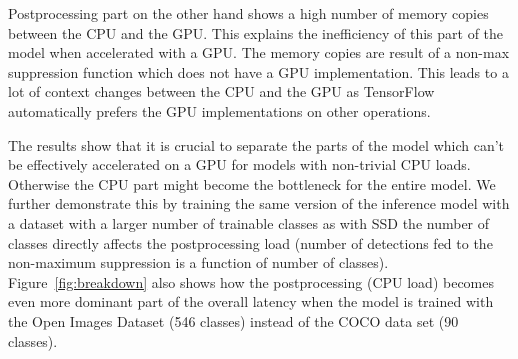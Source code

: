\documentclass[sigconf]{acmart}
\begin{document}
\begin{table}[]
\centering
\caption{Device placement and memory copy counts for SSD Inception V2 with automatic placement using TensorFlow. (H=Host, D=Device}
\label{tab:opcounts}
\end{table}

Postprocessing part on the other hand shows a high number of memory copies between the CPU and the GPU. This explains the inefficiency of this part of the model when accelerated with a GPU. The memory copies are result of a non-max suppression function which does not have a GPU implementation. This leads to a lot of context changes between the CPU and the GPU as TensorFlow automatically prefers the GPU implementations on other operations.

The results show that it is crucial to separate the parts of the model which can't be effectively accelerated on a GPU for models with non-trivial CPU loads. Otherwise the CPU part might become the bottleneck for the entire model. We further demonstrate this by training the same version of the inference model with a dataset with a larger number of trainable classes as with SSD the number of classes directly affects the postprocessing load (number of detections fed to the non-maximum suppression is a function of number of classes). Figure~\ref{fig:breakdown} also shows how the postprocessing (CPU load) becomes even more dominant part of the overall latency when the model is trained with the Open Images Dataset (546 classes) instead of the COCO data set (90 classes).
\end{document}
